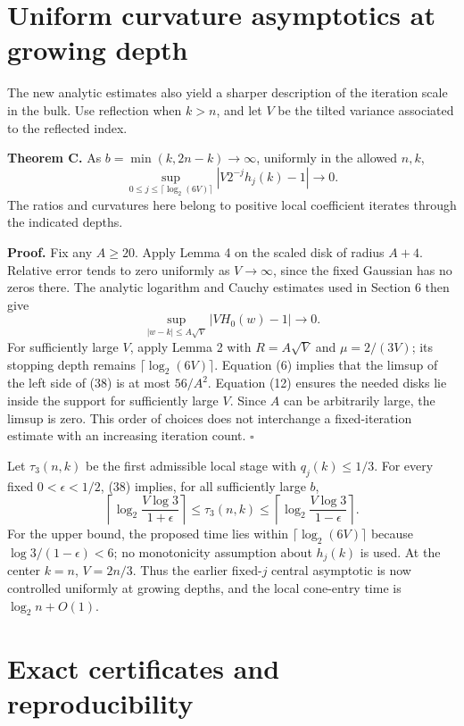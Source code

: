 \documentclass[11pt,a4paper]{article}
\begin{document}
\section{Uniform curvature asymptotics at growing depth}\label{uniform-curvature-asymptotics-at-growing-depth}


The new analytic estimates also yield a sharper description of the
iteration scale in the bulk. Use reflection when \(k>n\), and let \(V\)
be the tilted variance associated to the reflected index.

\textbf{Theorem C.} As \(b=\min(k,2n-k)\to\infty\), uniformly in the
allowed \(n,k\), \[
 \sup_{0\leq j\leq\lceil\log_2(6V)\rceil}
 \left|V2^{-j}h_j(k)-1\right|\longrightarrow0. \tag{38}
\] The ratios and curvatures here belong to positive local coefficient
iterates through the indicated depths.

\textbf{Proof.} Fix any \(A\geq20\). Apply Lemma 4 on the scaled disk of
radius \(A+4\). Relative error tends to zero uniformly as
\(V\to\infty\), since the fixed Gaussian has no zeros there. The
analytic logarithm and Cauchy estimates used in Section 6 then give \[
 \sup_{|w-k|\leq A\sqrt V}|VH_0(w)-1|\longrightarrow0.
\] For sufficiently large \(V\), apply Lemma 2 with \(R=A\sqrt V\) and
\(\mu=2/(3V)\); its stopping depth remains \(\lceil\log_2(6V)\rceil\).
Equation (6) implies that the limsup of the left side of (38) is at most
\(56/A^2\). Equation (12) ensures the needed disks lie inside the
support for sufficiently large \(V\). Since \(A\) can be arbitrarily
large, the limsup is zero. This order of choices does not interchange a
fixed-iteration estimate with an increasing iteration count. \(\square\)

Let \(\tau_3(n,k)\) be the first admissible local stage with
\(q_j(k)\leq1/3\). For every fixed \(0<\epsilon<1/2\), (38) implies, for
all sufficiently large \(b\), \[
 \left\lceil\log_2\frac{V\log3}{1+\epsilon}\right\rceil
 \leq\tau_3(n,k)\leq
 \left\lceil\log_2\frac{V\log3}{1-\epsilon}\right\rceil. \tag{39}
\] For the upper bound, the proposed time lies within
\(\lceil\log_2(6V)\rceil\) because \(\log3/(1-\epsilon)<6\); no
monotonicity assumption about \(h_j(k)\) is used. At the center \(k=n\),
\(V=2n/3\). Thus the earlier fixed-\(j\) central asymptotic is now
controlled uniformly at growing depths, and the local cone-entry time is
\(\log_2n+O(1)\).

\section{Exact certificates and reproducibility}\label{reproducibility-and-verification-audit}
\end{document}
